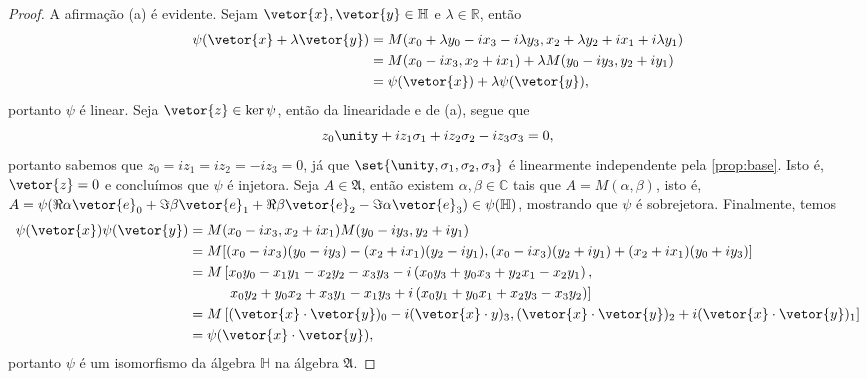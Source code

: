 \begin{proof}
    A afirmação (a) é evidente. Sejam \(\vetor{x}, \vetor{y} \in \mathbb{H}\) e \(\lambda \in \mathbb{R}\), então
    \begin{align*}
        \psi(\vetor{x} + \lambda \vetor{y})
        &= M(x_0 + \lambda y_0 - i x_3 - i \lambda y_3, x_2 + \lambda y_2 + i x_1 + i \lambda y_1)\\
        &= M(x_0 - i x_3, x_2 + i x_1) + \lambda M(y_0 - i y_3, y_2 + i y_1) \\
        &= \psi(\vetor{x}) + \lambda \psi(\vetor{y}),
    \end{align*}
    portanto \(\psi\) é linear. Seja \(\vetor{z} \in \ker{\psi}\), então da linearidade e de (a), segue que
    \begin{equation*}
        z_0 \unity +iz_1 \sigma_1 + iz_2 \sigma_2 - iz_3 \sigma_3 = 0,
    \end{equation*}
    portanto sabemos que \(z_0 = iz_1 = iz_2 =-iz_3 = 0\), já que \(\set{\unity, \sigma_1, \sigma_2, \sigma_3}\) é linearmente independente pela \cref{prop:base}. Isto é, \(\vetor{z} = 0\) e concluímos que \(\psi\) é injetora. Seja \(A \in \mathfrak{A}\), então existem \(\alpha, \beta \in \mathbb{C}\) tais que \(A = M(\alpha, \beta)\), isto é, \(A = \psi(\Re{\alpha} \vetor{e}_0+ \Im{\beta}\vetor{e}_1 + \Re{\beta}\vetor{e}_2 - \Im{\alpha}\vetor{e}_3) \in \psi(\mathbb{H})\), mostrando que \(\psi\) é sobrejetora. Finalmente, temos
    \begin{align*}
        \psi(\vetor{x})\psi(\vetor{y})
        &= M(x_0 - ix_3, x_2 + ix_1) M(y_0 - iy_3, y_2 + iy_1)\\
        &= M[(x_0 - ix_3)(y_0 - iy_3) - (x_2 + ix_1)(y_2 - iy_1), (x_0 - i x_3)(y_2 + iy_1) + (x_2 + i x_1)(y_0 + i y_3)]\\
        &= M\left[x_0 y_0 - x_1 y_1 - x_2 y_2 - x_3 y_3 - i\left(x_0 y_3 + y_0 x_3 + y_2 x_1 - x_2 y_1\right),\right. \\
        &\mathrel{\phantom{=}}\phantom{M\mathopen{[}}\left.x_0 y_2 + y_0 x_2 +x_3 y_1 -x_1 y_3 +i\left(x_0y_1 + y_0 x_1 + x_2y_3 - x_3 y_2\right)\right]\\
        &= M\left[(\vetor{x}\cdot\vetor{y})_0 - i(\vetor{x}\cdot{y})_3, (\vetor{x}\cdot\vetor{y})_2 + i(\vetor{x}\cdot\vetor{y})_1\right]\\
        &= \psi(\vetor{x}\cdot\vetor{y}),
    \end{align*}
    portanto \(\psi\) é um isomorfismo da álgebra \(\mathbb{H}\) na álgebra \(\mathfrak{A}\).
\end{proof}
